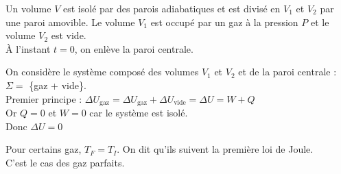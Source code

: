 ﻿\documentclass[a4paper]{article}
\begin{document}
\pagestyle{fancy}
\fancyhf{}
\setlength{\headheight}{15pt}

\begin{center}
	\large{}
\end{center}


Un volume $V$ est isolé par des parois adiabatiques et est divisé en $V_1$ et $V_2$ par une paroi amovible. Le volume $V_1$ est occupé par un gaz à la pression $P$ et le volume $V_2$ est vide.\\
À l'instant $t=0$, on enlève la paroi centrale.\par
On considère le système composé des volumes $V_1$ et $V_2$ et de la paroi centrale : $\Sigma=$ \{gaz + vide\}.\\
Premier principe : $\Delta U_{\text{gaz}}=\Delta U_{\text{gaz}}+\Delta U_{\text{vide}}=\Delta U=W+Q$\\
Or $Q=0$ et $W=0$ car le système est isolé.\\
Donc $\Delta U=0$\par
Pour certains gaz, $T_F=T_I$. On dit qu'ils suivent la première loi de Joule.\\
C'est le cas des gaz parfaits.
\end{document}
